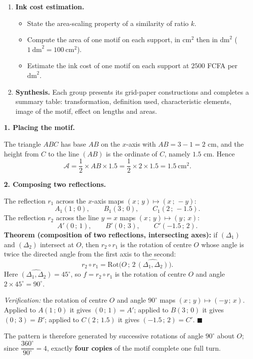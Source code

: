 \documentclass[11pt]{article}
\newcommand{\cle}[1]{{\popxbold\color{popdark}#1}}
\newcounter{popsec}
\newcounter{popsub}
\newcommand{\courssub}[1]{%
  \stepcounter{popsub}%
  \par\vspace{9pt}\noindent{\popxbold\fontsize{11.5}{13}\selectfont\color{popink}{\color{poporange}\thepopsec.\thepopsub}\hspace{6pt}#1}\par\nopagebreak\vspace{4pt}
}
\begin{document}
\begin{enumerate}
\begin{itemize}
\end{itemize}
\item \textbf{Ink cost estimation.}
\begin{itemize}
\item State the area-scaling property of a similarity of ratio $k$.
\item Compute the area of one motif on each support, in $\mathrm{cm}^2$ then in $\mathrm{dm}^2$ ($1\ \mathrm{dm}^2 = 100\ \mathrm{cm}^2$).
\item Estimate the ink cost of one motif on each support at $2500$ FCFA per $\mathrm{dm}^2$.
\end{itemize}
\item \textbf{Synthesis.} Each group presents its grid-paper constructions and completes a summary table: transformation, definition used, characteristic elements, image of the motif, effect on lengths and areas.
\end{enumerate}

\courssub{Model answer}

\textbf{1. Placing the motif.}\par
The triangle $ABC$ has base $AB$ on the $x$-axis with $AB = 3 - 1 = 2$ cm, and the height from $C$ to the line $(AB)$ is the ordinate of $C$, namely $1.5$ cm. Hence
\[ \mathcal{A} = \frac{1}{2} \times AB \times 1.5 = \frac{1}{2} \times 2 \times 1.5 = 1.5\ \mathrm{cm}^2. \]

\textbf{2. Composing two reflections.}\par
The reflection $r_1$ across the $x$-axis maps $(x\,;\,y) \mapsto (x\,;\,-y)$:
\[ A_1(1\,;\,0), \qquad B_1(3\,;\,0), \qquad C_1(2\,;\,-1.5). \]
The reflection $r_2$ across the line $y = x$ maps $(x\,;\,y) \mapsto (y\,;\,x)$:
\[ A'(0\,;\,1), \qquad B'(0\,;\,3), \qquad C'(-1.5\,;\,2). \]
\textbf{Theorem (composition of two reflections, intersecting axes):} if $(\Delta_1)$ and $(\Delta_2)$ intersect at $O$, then $r_2 \circ r_1$ is the \cle{rotation} of centre $O$ whose angle is twice the directed angle from the first axis to the second:
\[ r_2 \circ r_1 = \mathrm{Rot}\big(O\,;\, 2\,\widehat{(\Delta_1, \Delta_2)}\big). \]
Here $\widehat{(\Delta_1,\Delta_2)} = 45^{\circ}$, so $f = r_2 \circ r_1$ is the rotation of centre $O$ and angle $2 \times 45^{\circ} = 90^{\circ}$.\par
\emph{Verification:} the rotation of centre $O$ and angle $90^{\circ}$ maps $(x\,;\,y) \mapsto (-y\,;\,x)$. Applied to $A(1\,;\,0)$ it gives $(0\,;\,1) = A'$; applied to $B(3\,;\,0)$ it gives $(0\,;\,3) = B'$; applied to $C(2\,;\,1.5)$ it gives $(-1.5\,;\,2) = C'$. $\blacksquare$\par
The pattern is therefore generated by successive rotations of angle $90^{\circ}$ about $O$; since $\dfrac{360^{\circ}}{90^{\circ}} = 4$, exactly \textbf{four copies} of the motif complete one full turn.
\end{document}
